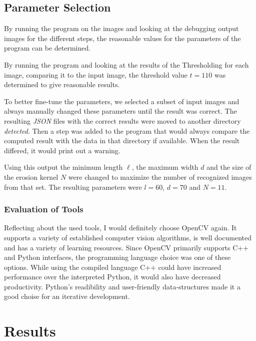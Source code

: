 \documentclass[serif,article,noparskip]{agse-thesis}
\begin{document}
\subsection{Parameter Selection} \label{parameter}

By running the program on the images and looking at the debugging output images
for the different steps, the reasonable values for the parameters of the program
can be determined.

By running the program and looking at the results of the Thresholding for each
image, comparing it to the input image, the threshold value $t = 110$ was
determined to give reasonable results.

To better fine-tune the parameters, we selected a subset of input images and
always manually changed these parameters until the result was correct. The
resulting \textit{JSON} files with the correct results were moved to another
directory \textit{detected}. Then a step was added to the program that would
always compare the computed result with the data in that directory if available.
When the result differed, it would print out a warning.

Using this output the minimum length $\ell$, the maximum width $d$ and the size of
the erosion kernel $N$ were changed to maximize the number of recognized images
from that set. The resulting parameters were $l = 60$, $d = 70$ and $N =11$.

\subsubsection{Evaluation of Tools}

Reflecting about the used tools, I would definitely choose OpenCV again. It
supports a variety of established computer vision algorithms, is well documented
and has a variety of learning resources. Since OpenCV primarily supports C++ and
Python interfaces, the programming language choice was one of these options.
While using the compiled language C++ could have increased performance over the
interpreted Python, it would also have decreased productivity.
Python's readibility and user-friendly data-structures made it a good choise for
an iterative development.

\section{Results} \label{results}
\end{document}
